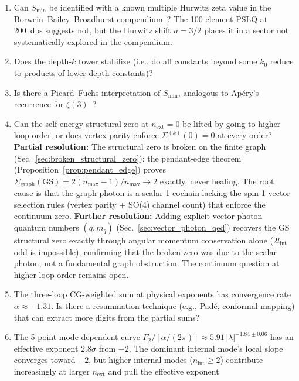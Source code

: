 \documentclass[11pt]{article}
\begin{document}
\begin{enumerate}
\item Can $S_{\min}$ be identified with a known multiple Hurwitz zeta
      value in the Borwein--Bailey--Broadhurst
      compendium~\cite{bailey2001}?  The 100-element PSLQ at 200~dps
      suggests not, but the Hurwitz shift $a = 3/2$ places it in a
      sector not systematically explored in the compendium.
\item Does the depth-$k$ tower stabilize (i.e., do all constants
      beyond some $k_0$ reduce to products of lower-depth constants)?
\item Is there a Picard--Fuchs interpretation of $S_{\min}$, analogous
      to Ap\'ery's recurrence for $\zeta(3)$~\cite{apery1979}?
\item Can the self-energy structural zero at $n_{\mathrm{ext}} = 0$
      be lifted by going to higher loop order, or does vertex parity
      enforce $\Sigma^{(k)}(0) = 0$ at every order?
      \textbf{Partial resolution:}
      The structural zero is broken on the finite graph
      (Sec.~\ref{sec:broken_structural_zero}): the pendant-edge theorem
      (Proposition~\ref{prop:pendant_edge}) proves
      $\Sigma_{\mathrm{graph}}(\mathrm{GS}) = 2(n_{\max}-1)/n_{\max}
      \to 2$ exactly, never healing.  The root cause is that the graph
      photon is a scalar 1-cochain lacking the spin-1 vector selection
      rules (vertex parity + SO(4) channel count) that enforce the
      continuum zero.
      \textbf{Further resolution:}
      Adding explicit vector photon quantum numbers $(q, m_q)$
      (Sec.~\ref{sec:vector_photon_qed}) recovers the GS structural
      zero exactly through angular momentum conservation alone
      ($2l_{\mathrm{int}}$ odd is impossible), confirming that the
      broken zero was due to the scalar photon, not a fundamental graph
      obstruction.
      The continuum question at higher loop order remains open.
\item The three-loop CG-weighted sum at physical exponents has
      convergence rate $\alpha \approx -1.31$.  Is there a
      resummation technique (e.g., Pad\'e, conformal mapping) that can
      extract more digits from the partial sums?
\item The 5-point mode-dependent curve
      $F_2 / [\alpha/(2\pi)] \approx 5.91\,|\lambda|^{-1.84 \pm 0.06}$
      has an effective exponent $2.8\sigma$ from $-2$.  The dominant
      internal mode's local slope converges toward $-2$, but higher
      internal modes ($n_{\mathrm{int}} \ge 2$) contribute increasingly
      at larger $n_{\mathrm{ext}}$ and pull the effective exponent

\end{enumerate}
\end{document}
